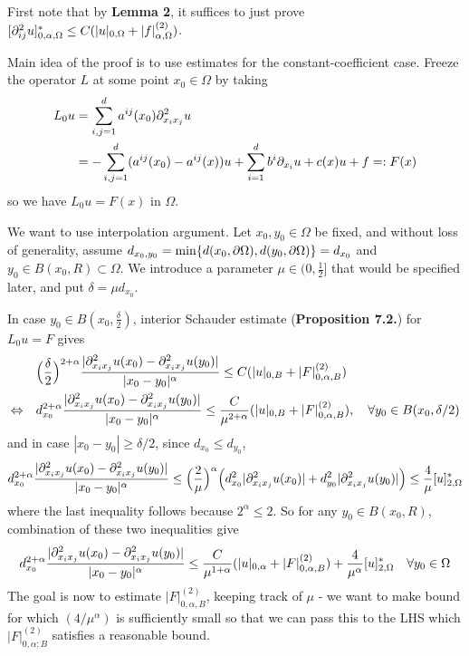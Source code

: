\documentclass[12pt,a4paper]{article}
\newenvironment{proof}
{\begin{changemargin}{0.5cm}{0.5cm} 
	}%
	{\end{changemargin}
}
\newenvironment{p}
{\begin{proof} 
	}%
	{\end{proof}
}
\begin{document}
\begin{p}
\pf First note that by \textbf{Lemma 2}, it suffices to just prove $[\partial^2_{ij} u]^*_{0, \alpha, \Omega} \leq C(|u|_{0, \Omega} + |f|^{(2)}_{\alpha, \Omega})$.

\quad Main idea of the proof is to use estimates for the constant-coefficient case. Freeze the operator $L$ at some point $x_0 \in \Omega$ by taking
\begin{align*}
L_0 u &= \sum_{i,j=1}^d a^{ij}(x_0) \partial^2_{x_i x_j}u \\
&= -\sum_{i,j =1}^d (a^{ij}(x_0)-a^{ij}(x)) u +\sum_{i=1}^d b^i \partial_{x_i} u + c(x) u +f =: F(x)
\end{align*}
so we have $L_0 u = F(x)$ in $\Omega$.
\s

We want to use interpolation argument. Let $x_0, y_0 \in \Omega$ be fixed, and without loss of generality, assume $d_{x_0, y_0} = \min \{d(x_0, \partial \Omega),d(y_0, \partial \Omega)\} = d_{x_0}$ and $y_0 \in B(x_0,R) \subset \Omega$. We introduce a parameter $\mu \in (0, \frac{1}{2}]$ that would be specified later, and put $\delta = \mu d_{x_0}$.

\quad In case $y_0 \in B(x_0, \frac{\delta}{2})$, interior Schauder estimate (\textbf{Proposition 7.2.}) for $L_0 u =F$ gives
\begin{align*}
& \Big( \frac{\delta}{2} \Big)^{2+\alpha}\frac{|\partial^2_{x_i x_j} u(x_0) - \partial^2_{x_i x_j} u(y_0)|}{|x_0 - y_0|^{\alpha}} \leq C(|u|_{0, B} + |F|^{(2)}_{0, \alpha, B}) \\
\Leftrightarrow \quad & d^{2+ \alpha}_{x_0}\frac{|\partial^2_{x_i x_j} u(x_0) - \partial^2_{x_i x_j} u(y_0)|}{|x_0 - y_0|^{\alpha}} \leq \frac{C}{\mu^{2+ \alpha}} (|u|_{0, B} + |F|^{(2)}_{0, \alpha, B}), \quad \forall y_0 \in B(x_0, \delta/2)
\end{align*}
and in case $|x_0 -y_0| \geq \delta/2$, since $d_{x_0} \leq d_{y_0}$, 
\begin{align*}
d_{x_0}^{2+\alpha} \frac{|\partial^2_{x_i x_j} u(x_0) - \partial^2_{x_i x_j} u(y_0)|}{|x_0 - y_0|^{\alpha}} \leq \Big(\frac{2}{\mu} \Big)^{\alpha} \Big( d_{x_0}^2 |\partial^2_{x_i x_j} u(x_0)| + d^2_{y_0} |\partial^2_{x_i x_j}u(y_0)| \Big) \leq \frac{4}{\mu} [u]^*_{2, \Omega}
\end{align*}
where the last inequality follows because $2^{\alpha}\leq 2$. So for any $y_0 \in B(x_0, R)$, combination of these two inequalities give
\begin{align*}
d^{2+ \alpha}_{x_0} \frac{|\partial^2_{x_i x_j} u(x_0) - \partial^2_{x_i x_j} u(y_0)|}{|x_0 - y_0|^{\alpha}} \leq \frac{C}{\mu^{1+ \alpha}} (|u|_{0, \alpha} + |F|^{(2)}_{0, \alpha, B}) + \frac{4}{\mu^{\alpha}} [u]^*_{2,\Omega} \quad \forall y_0 \in \Omega
\end{align*}
The goal is now to estimate $|F|^{(2)}_{0, \alpha, B}$, keeping track of $\mu$ - we want to make bound for which $(4/\mu^{\alpha})$ is sufficiently small so that we can pass this to the LHS which $|F|^{(2)}_{0, \alpha;B}$ satisfies a reasonable bound.
\s


\end{p}
\end{document}
